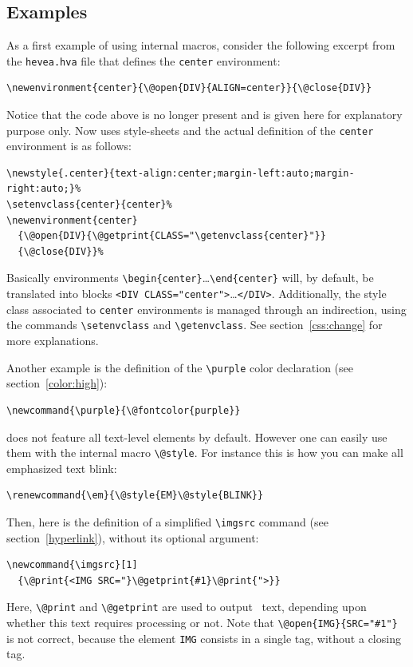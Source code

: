 \subsection{Examples}
As a first example of using internal macros, consider the following
excerpt from the \texttt{hevea.hva} file that
defines the \verb+center+ environment:
\begin{verbatim}
\newenvironment{center}{\@open{DIV}{ALIGN=center}}{\@close{DIV}}
\end{verbatim}
%
Notice that the code above is no longer present and is given here
for explanatory purpose only.
Now \hevea{} uses style-sheets and the actual definition of the
\verb+center+ environment is as follows:
\begin{verbatim}
\newstyle{.center}{text-align:center;margin-left:auto;margin-right:auto;}%
\setenvclass{center}{center}%
\newenvironment{center}
  {\@open{DIV}{\@getprint{CLASS="\getenvclass{center}"}}
  {\@close{DIV}}%
\end{verbatim}
Basically environments \verb+\begin{center}+\ldots\verb+\end{center}+ will, by
default, be translated into blocks
\verb+<DIV CLASS="center">+\ldots\verb+</DIV>+.
Additionally, the style class associated to \verb+center+ environments
is managed through an indirection, using the
commands \verb+\setenvclass+ and \verb+\getenvclass+.
See section~\ref{css:change} for more explanations.

Another example is the definition of the \verb+\purple+
color declaration (see section~\ref{color:high}):
\begin{verbatim}
\newcommand{\purple}{\@fontcolor{purple}}
\end{verbatim}

\hevea{} does not feature all text-level elements by default.
However one can easily use them with the internal macro
\verb+\@style+.
For instance this is how you can make all emphasized text blink:
\begin{verbatim}
\renewcommand{\em}{\@style{EM}\@style{BLINK}}
\end{verbatim}

Then, here is the definition of a simplified \verb+\imgsrc+
command (see section~\ref{hyperlink}), without its optional argument:
\begin{verbatim}
\newcommand{\imgsrc}[1]
  {\@print{<IMG SRC="}\@getprint{#1}\@print{">}}
\end{verbatim}
Here, \verb+\@print+ and \verb+\@getprint+ are used to output
\html~text, depending upon whether this text requires processing or not.
Note that \verb+\@open{IMG}{SRC="#1"}+ is not correct,
because the element \verb+IMG+ consists in a single tag, without a
closing tag.

